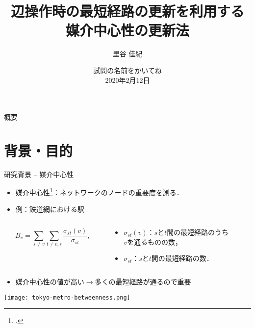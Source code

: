 \documentclass[dvipdfmx,fleqn]{beamer}
\title[媒介中心性更新法]{辺操作時の最短経路の更新を利用する \\ 媒介中心性の更新法}
\author[里谷]{里谷 佳紀}
\institute[情数工研]{情報数理工学研究室}
\date[試問]{\alert{試問の名前をかいてね} \\ 2020年2月12日}
\begin{document}
\makeIMELABtitle

\begin{frame}{概要}
  \tableofcontents
\end{frame}

\section{背景・目的}
\begin{frame}[t]{研究背景 -- 媒介中心性}
  \begin{itemize}
  \item \alert{媒介中心性}\footcite{05Freeman1977}：ネットワークのノードの重要度を測る．
  \item[] 例：鉄道網における駅
  \end{itemize}
  \begin{columns}
    \begin{column}{.4\textwidth}
      \begin{equation*}
        B_v=\sum_{s\neq v}\sum_{t\neq v,s}\frac{\sigma_{st}(v)}{\sigma_{st}},
      \end{equation*}
    \end{column}
    \begin{column}{.6\textwidth}
      \begin{itemize}
      \item $\sigma_{st}(v)$：$s$と$t$間の最短経路のうち\\$v$を通るものの数，
      \item $\sigma_{st}$：$s$と$t$間の最短経路の数．
      \end{itemize}
    \end{column}
  \end{columns}
  \medskip
  \begin{itemize}
  \item 媒介中心性の値が高い$\rightarrow$\alert{多くの最短経路が通る}ので重要
  \end{itemize}
  \vspace{-.5em}
  \begin{center}
    \texttt{[image: tokyo-metro-betweenness.png]}
  \end{center}
\end{frame}
\end{document}
